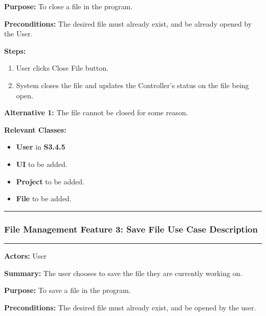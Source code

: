 \documentclass[twoside,letterpaper]{article}
\begin{document}
	\noindent\textbf{Purpose:} To close a file in the program. \newline
	
	\noindent\textbf{Preconditions:} The desired file must already exist, and be already opened by the User. \newline
	
	\noindent\textbf{Steps:}
	\begin{enumerate}
		\item User clicks Close File button.
		\item System closes the file and updates the Controller's status on the file being open.
	\end{enumerate}
	
	\noindent\textbf{Alternative 1:} The file cannot be closed for some reason. \newline
	
	\noindent\textbf{Relevant Classes:}
	\begin{itemize}
		\item \textbf{User} in \textbf{S3.4.5}
		\item \textbf{UI} to be added.
		\item \textbf{Project} to be added.
		\item \textbf{File} to be added.
	\end{itemize}
	\vspace{8pt}
	\hrule
	
	\newpage
	
	\subsubsection[File Management Feature 3: Save File Use Case Description]{\rmfamily\bfseries\color{black}
		File Management Feature 3: Save File Use Case Description}
	\hypertarget{RefHeading22059017292}{}
	
	\vspace{2pt}
	\hrule
	\vspace{8pt}
	\textbf{Actors:} User \newline
	
	\noindent\textbf{Summary:} The user chooses to save the file they are currently working on. \newline
	
	\noindent\textbf{Purpose:} To save a file in the program. \newline
	
	\noindent\textbf{Preconditions:} The desired file must already exist, and be opened by the user. \newline
	
\end{document}
